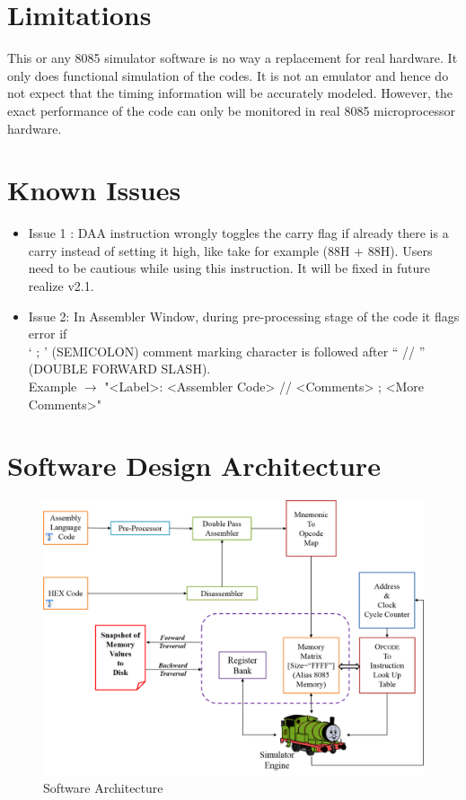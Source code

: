 \section{Limitations}

This or any 8085 simulator software is no way a replacement for real hardware. It only does functional simulation of the codes. It is not an emulator and hence do not expect that the timing information will be accurately modeled. However, the exact performance of the code can only be monitored in real 8085 microprocessor hardware. 

\section{Known Issues}
\begin{itemize}
	\item Issue 1 : DAA instruction wrongly toggles the carry flag if already there is a carry instead of setting it high, like take for example (88H + 88H). Users need to be cautious while using this instruction. It will be fixed in future realize v2.1.
	 \item Issue 2: In Assembler Window, during pre-processing stage of the code it flags error if\\ ` ; ' (SEMICOLON) comment marking character is followed after `` // '' (DOUBLE FORWARD SLASH).\\
	 Example $ \rightarrow $  "<Label>: <Assembler Code> // <Comments> ; <More Comments>"
\end{itemize}

\section{Software Design Architecture}

\begin{figure}[htbp]
	\centering 
	\includegraphics[width=0.9\linewidth]{./soft_arch.png}
	\caption{Software Architecture}
	\label{fig:software:architecture}
\end{figure}


